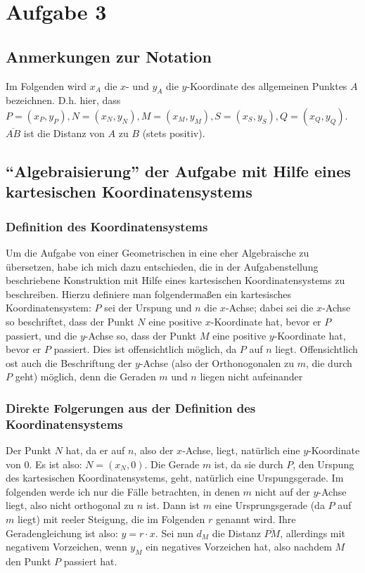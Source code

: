 \section{Aufgabe 3}

\subsection*{Anmerkungen zur Notation}

Im Folgenden wird $x_A$ die $x$- und $y_A$ die $y$-Koordinate des allgemeinen Punktes $A$ bezeichnen. D.h. hier, dass 
$P=(x_P, y_P), N=(x_N, y_N), M=(x_M, y_M), S=(x_S, y_S), Q=(x_Q, y_Q)$.\\
$\overline{AB}$ ist die Distanz von $A$ zu $B$ (stets positiv).

\subsection*{"`Algebraisierung"' der Aufgabe mit Hilfe eines kartesischen Koordinatensystems}

\subsubsection*{Definition des Koordinatensystems}

Um die Aufgabe von einer Geometrischen in eine eher Algebraische zu übersetzen, habe ich mich dazu entschieden, die 
in der Aufgabenstellung beschriebene Konstruktion mit Hilfe eines kartesischen Koordinatensystems zu beschreiben. 
Hierzu definiere man folgendermaßen ein kartesisches Koordinatensystem: $P$ sei der Urspung und $n$ die $x$-Achse; 
dabei sei die $x$-Achse so beschriftet, dass der Punkt $N$ eine positive $x$-Koordinate hat, bevor er $P$ passiert, 
und die $y$-Achse so, dass der Punkt $M$ eine positive $y$-Koordinate hat, bevor er $P$ passiert. Dies ist 
offensichtlich möglich, da $P$ auf $n$ liegt. Offensichtlich ost auch die Beschriftung der $y$-Achse (also der 
Orthonogonalen zu $m$, die durch $P$ geht) möglich, denn die Geraden $m$ und $n$ liegen nicht aufeinander

\subsubsection*{Direkte Folgerungen aus der Definition des Koordinatensystems}

Der Punkt $N$ hat, da er auf $n$, also der $x$-Achse, liegt, natürlich eine $y$-Koordinate von 0. Es ist also: 
$N=(x_N, 0)$. Die Gerade $m$ ist, da sie durch $P$, den Urspung des kartesischen Koordinatensystems, geht, natürlich 
eine Urspungsgerade. Im folgenden werde ich nur die Fälle betrachten, in denen $m$ nicht auf der $y$-Achse liegt, 
also nicht orthogonal zu $n$ ist. Dann ist $m$ eine Ursprungsgerade (da $P$ auf $m$ liegt) mit reeler Steigung, die 
im Folgenden $r$ genannt wird. Ihre Geradengleichung ist also: $y=r\cdot x$. Sei nun $d_M$ die Distanz $\overline{PM}$, 
allerdings mit negativem Vorzeichen, wenn $y_M$ ein negatives Vorzeichen hat, also nachdem $M$ den Punkt $P$ passiert 
hat.